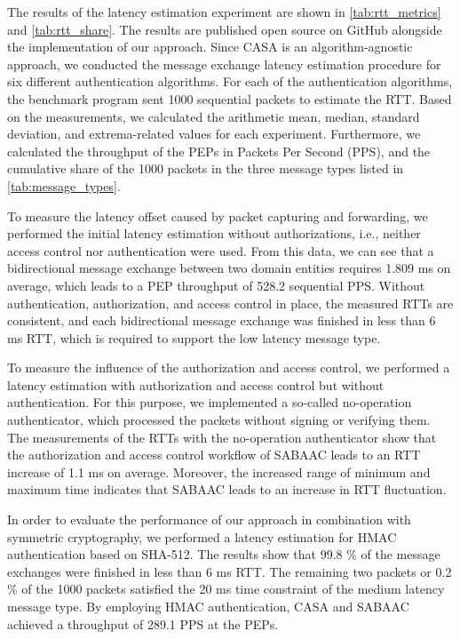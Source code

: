 The results of the latency estimation experiment are shown in \autoref{tab:rtt_metrics} and \autoref{tab:rtt_share}.
The results are published open source on GitHub \cite{gitcasc} alongside the implementation of our approach.
Since CASA is an algorithm-agnostic approach, we conducted the message exchange latency estimation procedure for six different authentication algorithms.
For each of the authentication algorithms, the benchmark program sent 1000 sequential packets to estimate the RTT.
Based on the measurements, we calculated the arithmetic mean, median, standard deviation, and extrema-related values for each experiment.
Furthermore, we calculated the throughput of the PEPs in Packets Per Second (PPS), and the cumulative share of the 1000 packets in the three message types listed in \autoref{tab:message_types}.

To measure the latency offset caused by packet capturing and forwarding, we performed the initial latency estimation without authorizations, i.e., neither access control nor authentication were used.
From this data, we can see that a bidirectional message exchange between two domain entities requires 1.809 ms on average, which leads to a PEP throughput of 528.2 sequential PPS.
Without authentication, authorization, and access control in place, the measured RTTs are consistent, and each bidirectional message exchange was finished in less than 6 ms RTT, which is required to support the low latency message type.

To measure the influence of the authorization and access control, we performed a latency estimation with authorization and access control but without authentication.
For this purpose, we implemented a so-called no-operation authenticator, which processed the packets without signing or verifying them.
The measurements of the RTTs with the no-operation authenticator show that the authorization and access control workflow of SABAAC leads to an RTT increase of 1.1 ms on average.
Moreover, the increased range of minimum and maximum time indicates that SABAAC leads to an increase in RTT fluctuation.

In order to evaluate the performance of our approach in combination with symmetric cryptography, we performed a latency estimation for HMAC authentication based on SHA-512.
The results show that 99.8 \% of the message exchanges were finished in less than 6 ms RTT.
The remaining two packets or 0.2 \% of the 1000 packets satisfied the 20 ms time constraint of the medium latency message type.
By employing HMAC authentication, CASA and SABAAC achieved a throughput of 289.1 PPS at the PEPs.

